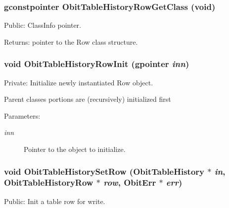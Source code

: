 \subsubsection{\setlength{\rightskip}{0pt plus 5cm}gconstpointer Obit\-Table\-History\-Row\-Get\-Class (void)}\label{ObitTableHistory_8c_a15}


Public: Class\-Info pointer. 

\begin{Desc}
\item[Returns:]pointer to the Row class structure. \end{Desc}
\subsubsection{\setlength{\rightskip}{0pt plus 5cm}void Obit\-Table\-History\-Row\-Init (gpointer {\em inn})}\label{ObitTableHistory_8c_a6}


Private: Initialize newly instantiated Row object. 

Parent classes portions are (recursively) initialized first \begin{Desc}
\item[Parameters:]
\begin{description}
\item[{\em inn}]Pointer to the object to initialize. \end{description}
\end{Desc}
\subsubsection{\setlength{\rightskip}{0pt plus 5cm}void Obit\-Table\-History\-Set\-Row ({\bf Obit\-Table\-History} $\ast$ {\em in}, {\bf Obit\-Table\-History\-Row} $\ast$ {\em row}, {\bf Obit\-Err} $\ast$ {\em err})}\label{ObitTableHistory_8c_a23}


Public: Init a table row for write. 

